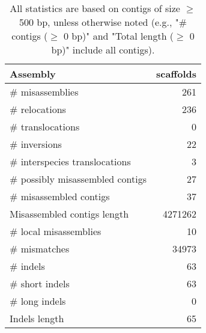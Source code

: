 \documentclass[12pt,a4paper]{article}
\begin{document}
\begin{table}[ht]
\begin{center}
\caption{All statistics are based on contigs of size $\geq$ 500 bp, unless otherwise noted (e.g., "\# contigs ($\geq$ 0 bp)" and "Total length ($\geq$ 0 bp)" include all contigs).}
\begin{tabular}{|l*{1}{|r}|}
\hline
Assembly & scaffolds \\ \hline
\# misassemblies & 261 \\ \hline
\hspace{5mm}\# relocations & 236 \\ \hline
\hspace{5mm}\# translocations & 0 \\ \hline
\hspace{5mm}\# inversions & 22 \\ \hline
\hspace{5mm}\# interspecies translocations & 3 \\ \hline
\# possibly misassembled contigs & 27 \\ \hline
\# misassembled contigs & 37 \\ \hline
Misassembled contigs length & 4271262 \\ \hline
\# local misassemblies & 10 \\ \hline
\# mismatches & 34973 \\ \hline
\# indels & 63 \\ \hline
\hspace{5mm}\# short indels & 63 \\ \hline
\hspace{5mm}\# long indels & 0 \\ \hline
Indels length & 65 \\ \hline
\end{tabular}
\end{center}
\end{table}
\end{document}
